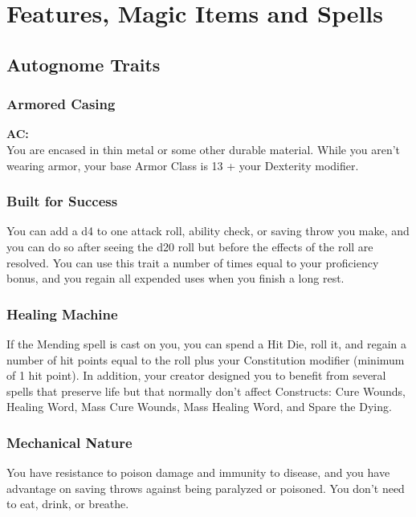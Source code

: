 \documentclass[letterpaper,openany,oneside,twocolumn]{book}
\begin{document}
\onecolumn


\rendercharactersheet

\renderbackgroundsheet

\renderspellsheet


\restoregeometry
\twocolumn

\chapter*{Features, Magic Items and Spells}

\section*{Autognome Traits}
\subsection*{Armored Casing}
\textbf{AC: }\\
You are encased in thin metal or some other durable material. While you aren't wearing armor, your base Armor Class is 13 + your Dexterity modifier.
\subsection*{Built for Success}
You can add a d4 to one attack roll, ability check, or saving throw you make, and you can do so after seeing the d20 roll but before the effects of the roll are resolved. You can use this trait a number of times equal to your proficiency bonus, and you regain all expended uses when you finish a long rest.
\subsection*{Healing Machine}
If the Mending spell is cast on you, you can spend a Hit Die, roll it, and regain a number of hit points equal to the roll plus your Constitution modifier (minimum of 1 hit point). In addition, your creator designed you to benefit from several spells that preserve life but that normally don't affect Constructs: Cure Wounds, Healing Word, Mass Cure Wounds, Mass Healing Word, and Spare the Dying.
\subsection*{Mechanical Nature}
You have resistance to poison damage and immunity to disease, and you have advantage on saving throws against being paralyzed or poisoned. You don't need to eat, drink, or breathe.
\end{document}

